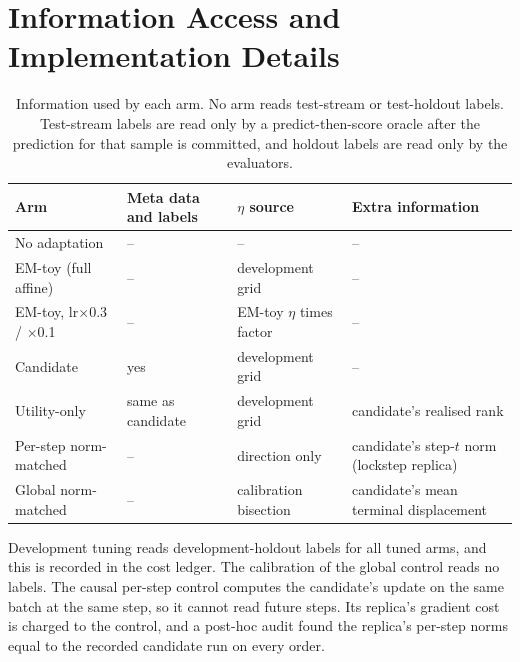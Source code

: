 \section{Information Access and Implementation Details}
\label{app:access}
\begin{table}[h]
\centering
\small
\setlength{\tabcolsep}{3pt}
\caption{Information used by each arm. No arm reads test-stream or test-holdout labels. Test-stream labels are
read only by a predict-then-score oracle after the prediction for that sample is committed, and holdout
labels are read only by the evaluators.}
\label{tab:access}
\begin{tabular}{>{\raggedright\arraybackslash}p{2.6cm}>{\raggedright\arraybackslash}p{2.3cm}>{\raggedright\arraybackslash}p{2.3cm}>{\raggedright\arraybackslash}p{3.6cm}}
\toprule
Arm & Meta data and labels & $\eta$ source & Extra information \\
\midrule
No adaptation & -- & -- & -- \\
EM-toy (full affine) & -- & development grid & -- \\
EM-toy, lr$\times$0.3 / $\times$0.1 & -- & EM-toy $\eta$ times factor & -- \\
Candidate & yes & development grid & -- \\
Utility-only & same as candidate & development grid & candidate's realised rank \\
Per-step norm-matched & -- & direction only & candidate's step-$t$ norm (lockstep replica) \\
Global norm-matched & -- & calibration bisection & candidate's mean terminal displacement \\
\bottomrule
\end{tabular}
\end{table}
Development tuning reads development-holdout labels for all tuned arms, and this is recorded in the cost
ledger. The calibration of the global control reads no labels. The causal per-step control computes the
candidate's update on the same batch at the same step, so it cannot read future steps. Its replica's gradient
cost is charged to the control, and a post-hoc audit found the replica's per-step norms equal to the recorded
candidate run on every order.

